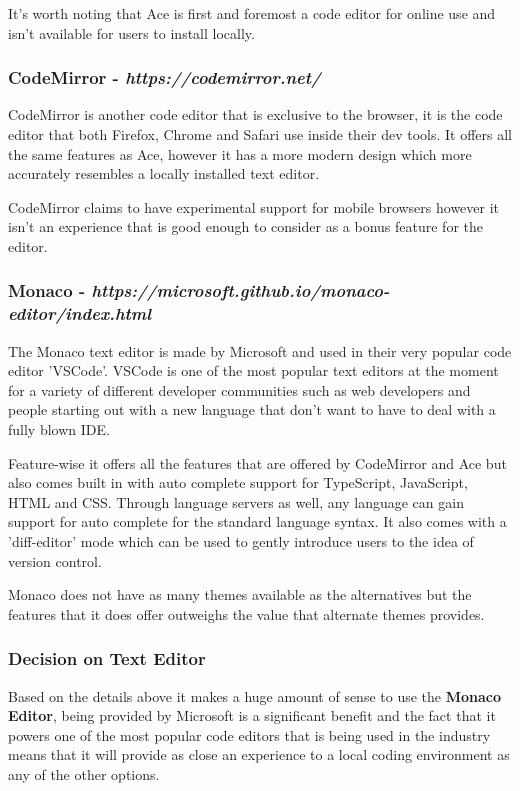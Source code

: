 It's worth noting that Ace is first and foremost a code editor for online use and isn't available for users to install locally.

\subsubsection{CodeMirror - \textit{https://codemirror.net/}}

CodeMirror is another code editor that is exclusive to the browser, it is the code editor that both Firefox, Chrome and Safari use inside their dev tools. It offers all the same features as Ace, however it has a more modern design which more accurately resembles a locally installed text editor.

CodeMirror claims to have experimental support for mobile browsers however it isn't an experience that is good enough to consider as a bonus feature for the editor.

\subsubsection{Monaco - \textit{https://microsoft.github.io/monaco-editor/index.html}}

The Monaco text editor is made by Microsoft and used in their very popular code editor 'VSCode'. VSCode is one of the most popular text editors at the moment for a variety of different developer communities such as web developers and people starting out with a new language that don't want to have to deal with a fully blown IDE.

Feature-wise it offers all the features that are offered by CodeMirror and Ace but also comes built in with auto complete support for TypeScript, JavaScript, HTML and CSS. Through language servers as well, any language can gain support for auto complete for the standard language syntax. It also comes with a 'diff-editor' mode which can be used to gently introduce users to the idea of version control.

Monaco does not have as many themes available as the alternatives but the features that it does offer outweighs the value that alternate themes provides.

\subsubsection{Decision on Text Editor}

Based on the details above it makes a huge amount of sense to use the \textbf{Monaco Editor}, being provided by Microsoft is a significant benefit and the fact that it powers one of the most popular code editors that is being used in the industry means that it will provide as close an experience to a local coding environment as any of the other options. 

